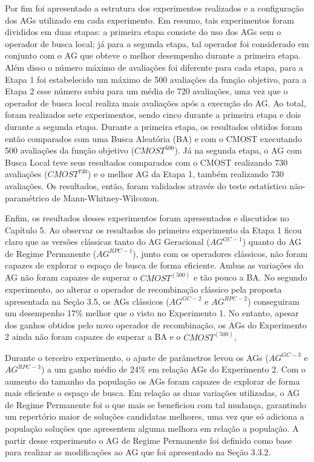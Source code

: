 Por fim foi apresentado a estrutura dos experimentos realizados e a configuração dos AGs utilizado em cada experimento. Em resumo, tais experimentos foram divididos em duas etapas: a primeira etapa consiste do uso dos AGs sem o operador de busca local; já para a segunda etapa, tal operador foi considerado em conjunto com o AG que obteve o melhor desempenho durante a primeira etapa. Além disso o número máximo de avaliações foi diferente para cada etapa, para a Etapa 1 foi estabelecido um máximo de 500 avaliações da função objetivo, para a Etapa 2 esse número subiu para um média de 720 avaliações, uma vez que o operador de busca local realiza mais avaliações após a execução do AG. Ao total, foram realizados sete experimentos, sendo cinco durante a primeira etapa e dois durante a segunda etapa. Durante a primeira etapa, os resultados obtidos foram então comparados com uma Busca Aleatória (BA) e com o CMOST executando 500 avaliações da função objetivo ($CMOST^{500}$). Já na segunda etapa, o AG com Busca Local teve seus resultados comparados com o CMOST realizando 730 avaliações ($CMOST^{730}$) e o melhor AG da Etapa 1, também realizando 730 avaliações. Os resultados, então, foram validados através do teste estatístico não-paramétrico de Mann-Whitney-Wilcoxon. 

Enfim, os resultados desses experimentos foram apresentados e discutidos no Capítulo 5. Ao observar os resultados do primeiro experimento da Etapa 1 ficou claro que as versões clássicas tanto do AG Geracional ($AG^{GC-1}$) quanto do AG de Regime Permanente ($AG^{RPC-1}$), junto com os operadores clássicos, não foram capazes de explorar o espaço de busca de forma eficiente.  Ambas as variações do AG não foram capazes de superar o $CMOST^(500)$ e tão pouco a BA. No segundo experimento, ao alterar o operador de recombinação clássico pela proposta apresentada na Seção  3.5, os AGs clássicos ($AG^{GC-2}$ e $AG^{RPC-2}$) conseguiram um desempenho 17\% melhor que o visto no Experimento 1. No entanto, apesar dos ganhos obtidos pelo novo operador de recombinação, os AGs do Experimento 2 ainda não foram capazes de superar a BA e o $CMOST^(500)$, 

Durante o terceiro experimento, o ajuste de parâmetros levou os AGs ($AG^{GC-3}$ e $AG^{RPC-3}$) a um ganho médio de 24\% em relação AGs do Experimento 2. Com o aumento do tamanho da população os AGs foram capazes de explorar de forma mais eficiente o espaço de busca. Em relação as duas variações utilizadas, o AG de Regime Permanente foi o que mais se beneficiou com tal mudança, garantindo um repertório maior de soluções candidatas melhores, uma vez que só adiciona a população soluções que apresentem alguma melhora em relação a população. A partir desse experimento o AG de Regime Permanente foi definido como base para realizar as modificações ao AG que foi apresentado na Seção  3.3.2. 

